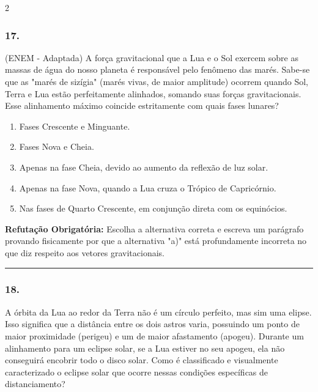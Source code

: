 \documentclass[twoside, 10pt, a4paper]{article}
\newlength{\espacoPreQuestao}
\newlength{\espacoQuestao}
\newlength{\espacoAlt}
\begin{document}
\begin{multicols*}{2}
\subsubsection*{17.} (ENEM - Adaptada) A força gravitacional que a Lua e o Sol exercem sobre as massas de água do nosso planeta é responsável pelo fenômeno das marés. Sabe-se que as "marés de sizígia" (marés vivas, de maior amplitude) ocorrem quando Sol, Terra e Lua estão perfeitamente alinhados, somando suas forças gravitacionais. Esse alinhamento máximo coincide estritamente com quais fases lunares?
\begin{enumerate}[label=\alph*), itemsep=\espacoAlt]
    \item Fases Crescente e Minguante.
    \item Fases Nova e Cheia.
    \item Apenas na fase Cheia, devido ao aumento da reflexão de luz solar.
    \item Apenas na fase Nova, quando a Lua cruza o Trópico de Capricórnio.
    \item Nas fases de Quarto Crescente, em conjunção direta com os equinócios.
\end{enumerate}
\begin{boxdica}
\textbf{Refutação Obrigatória:} Escolha a alternativa correta e escreva um parágrafo provando fisicamente por que a alternativa "a)" está profundamente incorreta no que diz respeito aos vetores gravitacionais.
\end{boxdica}
\par\vspace{\espacoQuestao}

\noindent\textcolor{CorLinha}{\rule{\linewidth}{0.5pt}} 
\par\vspace{\espacoPreQuestao}
\subsubsection*{18.} A órbita da Lua ao redor da Terra não é um círculo perfeito, mas sim uma elipse. Isso significa que a distância entre os dois astros varia, possuindo um ponto de maior proximidade (perigeu) e um de maior afastamento (apogeu). Durante um alinhamento para um eclipse solar, se a Lua estiver no seu apogeu, ela não conseguirá encobrir todo o disco solar. Como é classificado e visualmente caracterizado o eclipse solar que ocorre nessas condições específicas de distanciamento?
\par\vspace{\espacoQuestao}


\end{multicols*}
\end{document}
